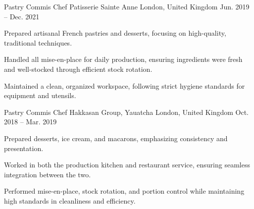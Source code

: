 

\begin{cventries}

  \cventry
    {Pastry Commis Chef} %
    {Patisserie Sainte Anne} %
    {London, United Kingdom} %
    {Jun. 2019 -- Dec. 2021} %
    {
      \begin{cvitems} %
        \item {Prepared artisanal French pastries and desserts, focusing on high-quality, traditional techniques.}
        \item {Handled all mise-en-place for daily production, ensuring ingredients were fresh and well-stocked through efficient stock rotation.}
        \vfill\null
        \columnbreak
        \item {Maintained a clean, organized workspace, following strict hygiene standards for equipment and utensils.}
      \end{cvitems}
    }

  \cventry
    {Pastry Commis Chef} %
    {Hakkasan Group, Yauatcha} %
    {London, United Kingdom} %
    {Oct. 2018 -- Mar. 2019} %
    {
      \begin{cvitems} %
        \item {Prepared desserts, ice cream, and macarons, emphasizing consistency and presentation.}
        \item {Worked in both the production kitchen and restaurant service, ensuring seamless integration between the two.}
        \vfill\null
        \columnbreak
        \item {Performed mise-en-place, stock rotation, and portion control while maintaining high standards in cleanliness and efficiency.}
      \end{cvitems}
    }


\end{cventries}
